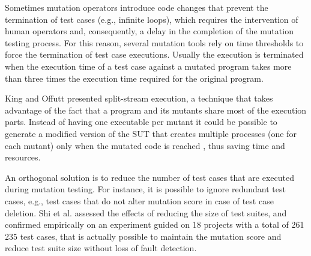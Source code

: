 
Sometimes mutation operators introduce code changes that prevent the termination of test cases (e.g., infinite loops), which requires the intervention of human operators and, consequently, a delay in the completion of the mutation testing process.
For this reason, several mutation tools rely on time thresholds to force the termination of test case executions. 
Usually the execution is terminated when the execution time of a test case against a mutated program takes more than three times the execution time required for the original program.

King and Offutt \cite{king1991fortran} presented split-stream execution, a technique that takes advantage of the fact that a program and its mutants share most of the execution parts. Instead of having one executable per mutant it could be possible to generate a modified version of the SUT that creates multiple processes (one for each mutant) only when the mutated code is reached \cite{tokumoto2016muvm}, thus saving time and resources. 


An orthogonal solution is to reduce the number of test cases that are executed during mutation testing.
For instance, it is possible to ignore redundant test cases, e.g., test cases that do not alter mutation score in case of test case deletion. Shi et al. \cite{shi2014balancing} assessed the effects of reducing the size of test suites, and confirmed empirically on an experiment guided on 18 projects with a total of 261\,235 test cases, that is actually possible to maintain the mutation score and reduce test suite size without loss of fault detection.

